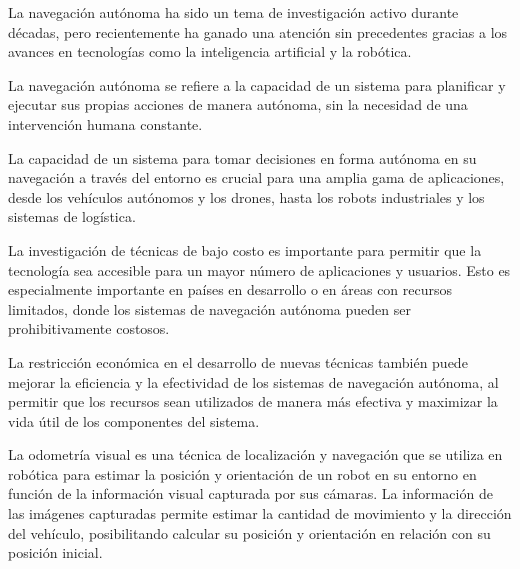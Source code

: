 \documentclass[
11pt, %
codirector, %
]{charter}
\begin{document}



La navegación autónoma ha sido un tema de investigación activo durante décadas, pero recientemente ha ganado una atención sin precedentes gracias a los avances en tecnologías como la inteligencia artificial y la robótica.

La navegación autónoma se refiere a la capacidad de un sistema para planificar y ejecutar sus propias acciones de manera autónoma, sin la necesidad de una intervención humana constante.

La capacidad de un sistema para tomar decisiones en forma autónoma en su navegación a través del entorno es crucial para una amplia gama de aplicaciones, desde los vehículos autónomos y los drones, hasta los robots industriales y los sistemas de logística.

La investigación de técnicas de bajo costo es importante para permitir que la tecnología sea accesible para un mayor número de aplicaciones y usuarios. Esto es especialmente importante en países en desarrollo o en áreas con recursos limitados, donde los sistemas de navegación autónoma pueden ser prohibitivamente costosos. 

La restricción económica en el desarrollo de nuevas técnicas también puede mejorar la eficiencia y la efectividad de los sistemas de navegación autónoma, al permitir que los recursos sean utilizados de manera más efectiva y maximizar la vida útil de los componentes del sistema.

La odometría visual es una técnica de localización y navegación que se utiliza en robótica para estimar la posición y orientación de un robot en su entorno en función de la información visual capturada por sus cámaras. La información de las imágenes capturadas permite estimar la cantidad de movimiento y la dirección del vehículo, posibilitando calcular su posición y orientación en relación con su posición inicial.
\end{document}
